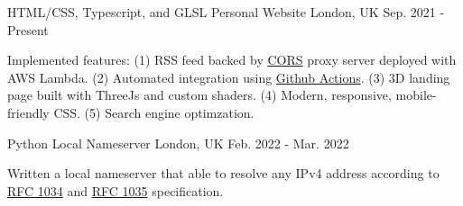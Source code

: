 

\begin{cventries}

  \cventry
    {HTML/CSS, Typescript, and GLSL} %
    {Personal Website} %
    {London, UK} %
    {Sep. 2021 - Present} %
    {
      \begin{cvitems} %
        \item {Implemented features: (1) RSS feed backed by \href{https://developer.mozilla.org/en-US/docs/Web/HTTP/CORS}{CORS} proxy server deployed with AWS Lambda. (2) Automated integration using \href{https://github.com/features/actions}{Github Actions}. (3) 3D landing page built with ThreeJs and custom shaders. (4) Modern, responsive, mobile-friendly CSS. (5) Search engine optimzation.}
      \end{cvitems}
    }

  \cventry
    {Python} %
    {Local Nameserver} %
    {London, UK} %
    {Feb. 2022 - Mar. 2022} %
    {
      \begin{cvitems} %
        \item {Written a local nameserver that able to resolve any IPv4 address according to \href{https://datatracker.ietf.org/doc/html/rfc1034}{RFC 1034} and \href{https://datatracker.ietf.org/doc/html/rfc1035}{RFC 1035} specification.}
      \end{cvitems}
    }


\end{cventries}
